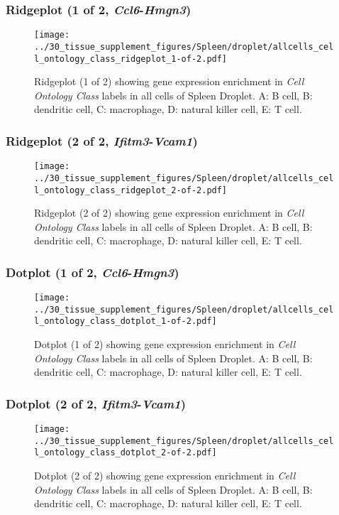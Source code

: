 \subsubsection{Ridgeplot (1 of 2, \emph{Ccl6}-\emph{Hmgn3})}
\begin{figure}[h]
\centering
\texttt{[image: ../30\_tissue\_supplement\_figures/Spleen/droplet/allcells\_cell\_ontology\_class\_ridgeplot\_1-of-2.pdf]}

\caption{ Ridgeplot (1 of 2)  showing gene expression enrichment in \emph{Cell Ontology Class} labels in all cells of Spleen Droplet. A: B cell, B: dendritic cell, C: macrophage, D: natural killer cell, E: T cell.}
\end{figure}


\clearpage

\subsubsection{Ridgeplot (2 of 2, \emph{Ifitm3}-\emph{Vcam1})}
\begin{figure}[h]
\centering
\texttt{[image: ../30\_tissue\_supplement\_figures/Spleen/droplet/allcells\_cell\_ontology\_class\_ridgeplot\_2-of-2.pdf]}

\caption{ Ridgeplot (2 of 2)  showing gene expression enrichment in \emph{Cell Ontology Class} labels in all cells of Spleen Droplet. A: B cell, B: dendritic cell, C: macrophage, D: natural killer cell, E: T cell.}
\end{figure}


\clearpage

\subsubsection{Dotplot (1 of 2, \emph{Ccl6}-\emph{Hmgn3})}
\begin{figure}[h]
\centering
\texttt{[image: ../30\_tissue\_supplement\_figures/Spleen/droplet/allcells\_cell\_ontology\_class\_dotplot\_1-of-2.pdf]}

\caption{ Dotplot (1 of 2)  showing gene expression enrichment in \emph{Cell Ontology Class} labels in all cells of Spleen Droplet. A: B cell, B: dendritic cell, C: macrophage, D: natural killer cell, E: T cell.}
\end{figure}


\clearpage

\subsubsection{Dotplot (2 of 2, \emph{Ifitm3}-\emph{Vcam1})}
\begin{figure}[h]
\centering
\texttt{[image: ../30\_tissue\_supplement\_figures/Spleen/droplet/allcells\_cell\_ontology\_class\_dotplot\_2-of-2.pdf]}

\caption{ Dotplot (2 of 2)  showing gene expression enrichment in \emph{Cell Ontology Class} labels in all cells of Spleen Droplet. A: B cell, B: dendritic cell, C: macrophage, D: natural killer cell, E: T cell.}
\end{figure}


